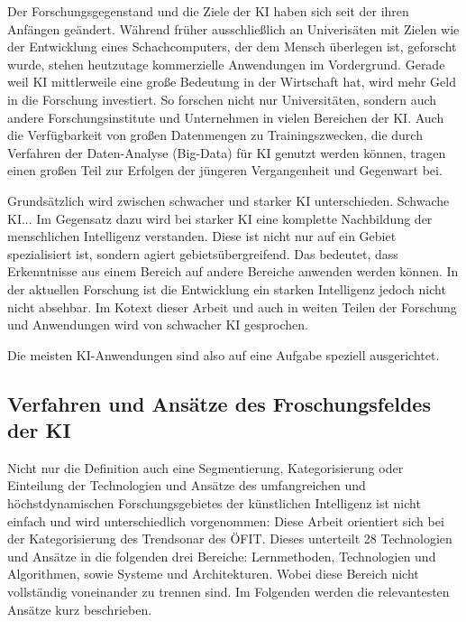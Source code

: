 \documentclass[a4paper,12pt, german]{report}
\begin{document}
Der Forschungsgegenstand und die Ziele der KI haben sich seit der ihren Anfängen geändert. Während früher ausschließlich an Univerisäten mit Zielen wie der Entwicklung eines Schachcomputers, der dem Mensch überlegen ist, geforscht wurde, stehen heutzutage kommerzielle Anwendungen im Vordergrund. 
Gerade weil KI mittlerweile eine große Bedeutung in der Wirtschaft hat, wird mehr Geld in die Forschung investiert. So forschen nicht nur Universitäten, sondern auch andere Forschungsinstitute und Unternehmen in vielen Bereichen der KI. Auch die Verfügbarkeit von großen Datenmengen zu Trainingszwecken, die durch Verfahren der Daten-Analyse (Big-Data) für KI genutzt werden können, tragen einen großen Teil zur Erfolgen der jüngeren Vergangenheit und Gegenwart bei. 

Grundsätzlich wird zwischen schwacher und starker KI unterschieden. Schwache KI... 
Im Gegensatz dazu wird bei starker KI eine komplette Nachbildung der menschlichen Intelligenz verstanden. Diese ist nicht nur auf ein Gebiet spezialisiert ist, sondern agiert gebietsübergreifend. Das bedeutet, dass Erkenntnisse aus einem Bereich auf andere Bereiche anwenden werden können. In der aktuellen Forschung ist die Entwicklung ein starken Intelligenz jedoch nicht nicht absehbar. 
Im Kotext dieser Arbeit und auch in weiten Teilen der Forschung und Anwendungen wird von schwacher KI gesprochen.

Die meisten KI-Anwendungen sind also auf eine Aufgabe speziell ausgerichtet. 

\subsection{Verfahren und Ansätze des Froschungsfeldes der KI}

Nicht nur die Definition auch eine Segmentierung, Kategorisierung oder Einteilung der Technologien und Ansätze des umfangreichen und höchstdynamischen Forschungsgebietes der künstlichen Intelligenz ist nicht einfach und wird unterschiedlich vorgenommen:
Diese Arbeit orientiert sich bei der Kategorisierung des Trendsonar des ÖFIT. Dieses unterteilt 28 Technologien und Ansätze in die folgenden drei Bereiche: Lernmethoden, Technologien und Algorithmen, sowie Systeme und Architekturen. Wobei diese Bereich nicht vollständig voneinander zu trennen sind. Im Folgenden werden die relevantesten Ansätze kurz beschrieben. 
\end{document}
